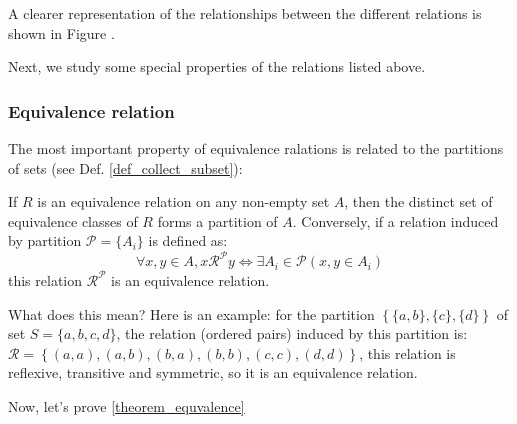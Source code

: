 A clearer representation of the relationships between the different relations is shown in Figure .

Next, we study some special properties of the relations listed above.

\subsubsection*{Equivalence relation}
The most important property of equivalence ralations is related to the partitions of sets (see Def. \ref{def_collect_subset}):
\begin{theorem}\label{theorem_equvalence}
    If $R$ is an equivalence relation on any non-empty set $A$, then the distinct set of equivalence classes of $R$ forms a partition of $A$.
    Conversely, if a relation induced by partition $\mathcal{P}=\{A_i\}$ is defined as:
    $$
    \forall x,y\in A, x\mathcal{R}^{\mathcal{P}}y \Leftrightarrow \exists A_i \in \mathcal{P}(x,y\in A_i)
    $$
    this relation $\mathcal{R}^{\mathcal{P}}$ is an equivalence relation.
\end{theorem}

What does this mean? Here is an example: for the partition $\left\{\{a,b\},\{c\},\{d\}\right\}$ of set $S=\{a,b,c,d\}$, the relation (ordered pairs) induced by this partition 
is: $\mathcal{R}=\left\{(a,a),(a,b),(b,a),(b,b),(c,c),(d,d)\right\}$, this relation is reflexive, transitive and symmetric, so it is an equivalence relation.

Now, let's prove \ref{theorem_equvalence}